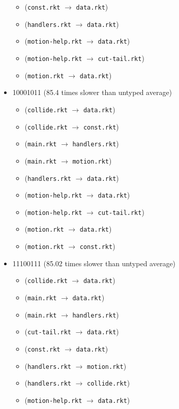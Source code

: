 \documentclass{article}
\newcommand{\mono}[1]{\texttt{#1}}
\begin{document}
\begin{itemize}
\begin{itemize}
  \item (\mono{const.rkt} $\rightarrow$ \mono{data.rkt})
  \item (\mono{handlers.rkt} $\rightarrow$ \mono{data.rkt})
  \item (\mono{motion-help.rkt} $\rightarrow$ \mono{data.rkt})
  \item (\mono{motion-help.rkt} $\rightarrow$ \mono{cut-tail.rkt})
  \item (\mono{motion.rkt} $\rightarrow$ \mono{data.rkt})
  \end{itemize}
\item 10001011 (85.4 times slower than untyped average)
  \begin{itemize}
  \item (\mono{collide.rkt} $\rightarrow$ \mono{data.rkt})
  \item (\mono{collide.rkt} $\rightarrow$ \mono{const.rkt})
  \item (\mono{main.rkt} $\rightarrow$ \mono{handlers.rkt})
  \item (\mono{main.rkt} $\rightarrow$ \mono{motion.rkt})
  \item (\mono{handlers.rkt} $\rightarrow$ \mono{data.rkt})
  \item (\mono{motion-help.rkt} $\rightarrow$ \mono{data.rkt})
  \item (\mono{motion-help.rkt} $\rightarrow$ \mono{cut-tail.rkt})
  \item (\mono{motion.rkt} $\rightarrow$ \mono{data.rkt})
  \item (\mono{motion.rkt} $\rightarrow$ \mono{const.rkt})
  \end{itemize}
\item 11100111 (85.02 times slower than untyped average)
  \begin{itemize}
  \item (\mono{collide.rkt} $\rightarrow$ \mono{data.rkt})
  \item (\mono{main.rkt} $\rightarrow$ \mono{data.rkt})
  \item (\mono{main.rkt} $\rightarrow$ \mono{handlers.rkt})
  \item (\mono{cut-tail.rkt} $\rightarrow$ \mono{data.rkt})
  \item (\mono{const.rkt} $\rightarrow$ \mono{data.rkt})
  \item (\mono{handlers.rkt} $\rightarrow$ \mono{motion.rkt})
  \item (\mono{handlers.rkt} $\rightarrow$ \mono{collide.rkt})
  \item (\mono{motion-help.rkt} $\rightarrow$ \mono{data.rkt})

\end{itemize}
\end{itemize}
\end{document}
